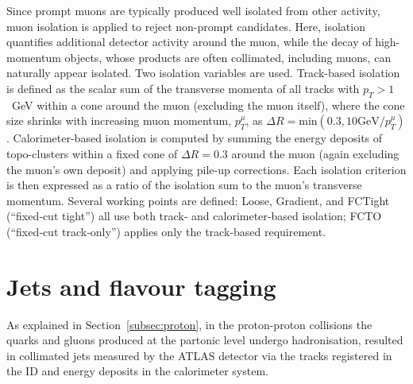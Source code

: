 Since prompt muons are typically produced well isolated from other activity, muon isolation is applied to reject non-prompt candidates. Here, isolation quantifies additional detector activity around the muon, while the decay of high-momentum objects, whose products are often collimated, including muons, can naturally appear isolated.
Two isolation variables are used. Track-based isolation is defined as the scalar sum of the transverse momenta of all tracks with $p_{T}\gt1$~GeV within a cone around the muon (excluding the muon itself), where the cone size shrinks with increasing muon momentum, $p^{\mu}_{T}$, as $\Delta R = \text{min}(0.3, 10 \text{GeV}/p^{\mu}_{T})$.
Calorimeter-based isolation is computed by summing the energy deposits of topo-clusters within a fixed cone of $\Delta R=0.3$ around the muon (again excluding the muon’s own deposit) and applying pile-up corrections. Each isolation criterion is then expressed as a ratio of the isolation sum to the muon’s transverse momentum.
Several working points are defined: Loose, Gradient, and FCTight (“fixed‐cut tight”) all use both track‐ and calorimeter‐based isolation; FCTO (“fixed‐cut track‐only”) applies only the track‐based requirement.

\section{Jets and flavour tagging}
\label{sec:jets}
As explained in Section~\ref{subsec:proton}, in the proton-proton collisions the quarks and gluons produced at the partonic level undergo hadronisation, resulted in collimated jets measured by the ATLAS detector via the tracks registered in the ID and energy deposits in the calorimeter system. 

